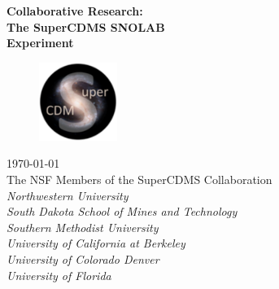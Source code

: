 \begin{titlepage}

\begin{center}
\textbf{\Huge Collaborative Research:}\\[0.9cm]
\textbf{\Huge The SuperCDMS SNOLAB}\\[0.8cm]
\textbf{\Huge Experiment}\\[1.8cm]

\begin{figure}
\begin{center}
\includegraphics[height=1in]{Figures/SuperCDMS_logo.png}
\end{center}
\end{figure}

\textrm{\today}\\[1.8cm]

\textrm{\LARGE The NSF Members of the SuperCDMS Collaboration}\\[0.9cm]
\textit{\Large
Northwestern University \\
South Dakota School of Mines and Technology \\
Southern Methodist University \\
University of California at Berkeley \\ 
University of Colorado Denver \\
University of Florida \\} 

\end{center}


\end{titlepage}